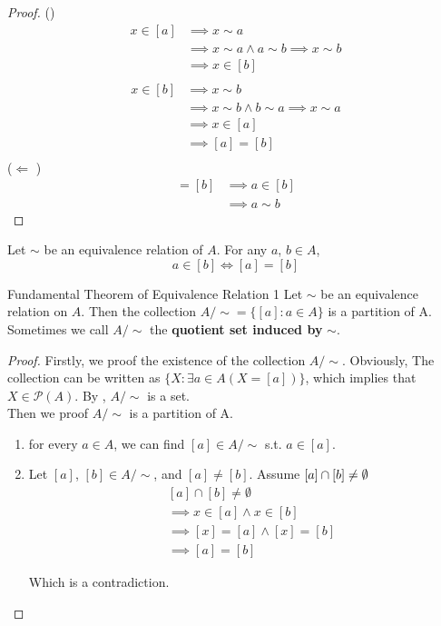\begin{proof}
  (\implies )
  \begin{align*}
    x \in [a] &\implies x \sim a\\
    &\implies x \sim a \land a \sim b \implies x \sim b\\
    &\implies x \in [b]\\
  \end{align*}
  \begin{align*}
    x \in [b] &\implies x \sim b\\
    &\implies x \sim b \land b \sim a \implies x \sim a\\
    &\implies x \in [a]\\
    &\implies [a] = [b]\\
  \end{align*}
  ($\Leftarrow $ )
  \begin{align*}
    [a] = [b] &\implies a \in [b]\\
    &\implies a \sim b
  \end{align*}
\end{proof}

\begin{corollary}{}{}
  Let $\sim$ be an equivalence relation of $A$. For any $a$, $b \in A$,
  \begin{equation*}
    a \in [b] \iff [a] = [b]
  \end{equation*}
\end{corollary}

\begin{theorem}{Fundamental Theorem of Equivalence Relation 1}{}
  Let $\sim$ be an equivalence relation on $A$. Then the collection
  $A/\sim = \{[a]: a \in A\} $ is a partition of A. Sometimes we call
  $A/\sim$ the \textbf{quotient set induced by} $\sim$.
\end{theorem}

\begin{proof}
  Firstly, we proof the existence of the collection $A/\sim$.
  Obviously, The collection can be written as $\{X: \exists a \in A
  (X = [a])\}$, which implies that $X \in \mathcal{P}(A) $. By
  , $A/\sim$ is a set.\\
  Then we proof $A/\sim$ is a partition of A.
  \begin{enumerate}

    \item for every $a \in A$, we can find $[a] \in A/\sim$ s.t. $a \in [a]$.
    \item Let $[a]$, $[b] \in A/\sim$, and  $[a] \neq [b]$. Assume
      $[a] \cap [b] \neq \emptyset\\$
      \begin{align*}
        &[a] \cap [b] \neq \emptyset \\
        &\implies x \in [a] \land x \in [b]\\
        &\implies [x] = [a] \land [x] = [b]\\
        &\implies [a] = [b]
      \end{align*}

      Which is a contradiction.

  \end{enumerate}
\end{proof}

